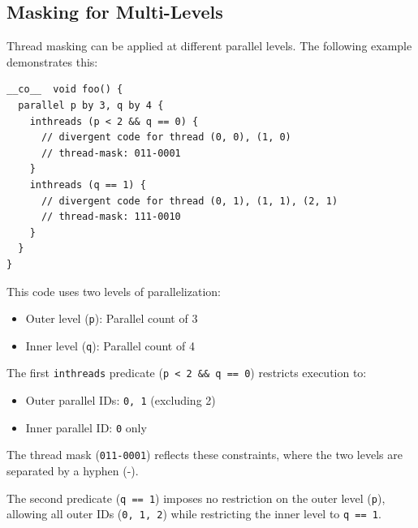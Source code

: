 \subsection*{Masking for Multi-Levels}

Thread masking can be applied at different parallel levels. The following example demonstrates this:

\begin{lstlisting}[language=croqtile,caption={Masking for Multi-Levels}]
__co__  void foo() {
  parallel p by 3, q by 4 {
    inthreads (p < 2 && q == 0) {
      // divergent code for thread (0, 0), (1, 0)
      // thread-mask: 011-0001
    }
    inthreads (q == 1) {
      // divergent code for thread (0, 1), (1, 1), (2, 1)
      // thread-mask: 111-0010
    }
  }
}
\end{lstlisting}

This code uses two levels of parallelization:

\begin{itemize}[leftmargin=1.6em]
\item Outer level (\texttt{p}): Parallel count of 3
\item Inner level (\texttt{q}): Parallel count of 4
\end{itemize}

The first \texttt{inthreads} predicate (\texttt{p \textless{} 2 \&\& q == 0}) restricts execution to:

\begin{itemize}[leftmargin=1.6em]
\item Outer parallel IDs: \texttt{0, 1} (excluding 2)
\item Inner parallel ID: \texttt{0} only
\end{itemize}

The thread mask (\texttt{011-0001}) reflects these constraints, where the two levels are separated by a hyphen (-).

The second predicate (\texttt{q == 1}) imposes no restriction on the outer level (\texttt{p}), allowing all outer IDs (\texttt{0, 1, 2}) while restricting the inner level to \texttt{q == 1}.
